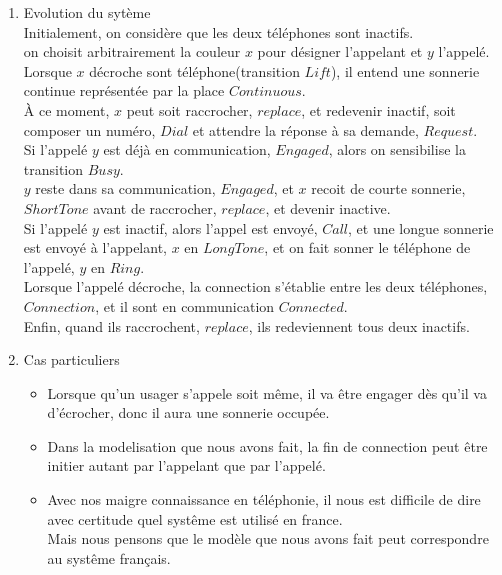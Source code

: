 \begin{enumerate}
\item Evolution du sytème\\
Initialement, on considère que les deux téléphones sont inactifs.\\
on choisit arbitrairement la couleur $x$ pour désigner l'appelant et $y$ l'appelé.\\
Lorsque $x$ décroche sont téléphone(transition $Lift$), il entend une sonnerie continue représentée par la place $Continuous$.\\
À ce moment, $x$ peut soit raccrocher, $replace$, et redevenir inactif, soit composer un numéro, $Dial$ et attendre la réponse à sa demande, $Request$.\\
Si l'appelé $y$ est déjà en communication, $Engaged$, alors on sensibilise la transition $Busy$.\\
$y$ reste dans sa communication, $Engaged$, et $x$ recoit de courte sonnerie, $Short Tone$ avant de raccrocher, $replace$, et devenir inactive.\\
Si l'appelé $y$ est inactif, alors l'appel est envoyé, $Call$, et une longue sonnerie est envoyé à l'appelant, $x$ en $Long Tone$, et on fait sonner le téléphone de l'appelé, $y$ en $Ring$.\\
Lorsque l'appelé décroche, la connection s'établie entre les deux téléphones, $Connection$, et il sont en communication $Connected$.\\
Enfin, quand ils raccrochent, $replace$, ils redeviennent tous deux inactifs.

\item Cas particuliers
  \begin{itemize}
    \item Lorsque qu'un usager s'appele soit même, il va être engager dès qu'il va d'écrocher, donc il aura une sonnerie occupée. 
    \item Dans la modelisation que nous avons fait, la fin de connection peut être initier autant par l'appelant que par l'appelé.
    \item Avec nos maigre connaissance en téléphonie, il nous est difficile de dire avec certitude quel systême est utilisé en france.\\
Mais nous pensons que le modèle que nous avons fait peut correspondre au systême français.

  \end{itemize}
\end{enumerate}

\newpage
